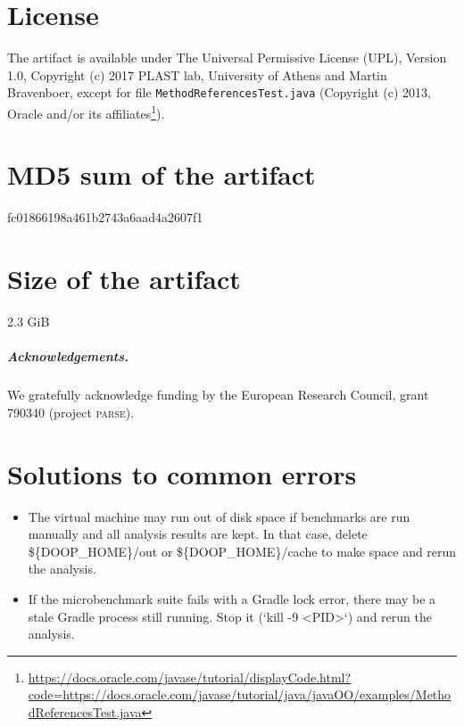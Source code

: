 \documentclass[a4paper,UKenglish]{darts-v2019}
\newcommand{\license}[1]{{\section{License}#1}}
\newcommand{\mdsum}[1]{{\section{MD5 sum of the artifact}#1}}
\newcommand{\artifactsize}[1]{{\section{Size of the artifact}#1}}
\newcommand{\fundacks}{We gratefully acknowledge funding by the European Research Council, grant 790340 (project \textsc{parse}).}
\begin{document}
\license{The artifact is available under The Universal Permissive
  License (UPL), Version 1.0, Copyright (c) 2017 PLAST lab, University
  of Athens and Martin Bravenboer, except for file
  \texttt{MethodReferencesTest.java} (Copyright (c) 2013, Oracle
  and/or its
  affiliates\footnote{\url{https://docs.oracle.com/javase/tutorial/displayCode.html?code=https://docs.oracle.com/javase/tutorial/java/javaOO/examples/MethodReferencesTest.java}}).}

\mdsum{fc01866198a461b2743a6aad4a2607f1}

\artifactsize{2.3 GiB}

\subparagraph*{Acknowledgements.}

\fundacks{}

\appendix
\section{Solutions to common errors}
\label{app:troubleshooting}

\begin{itemize}
\item The virtual machine may run out of disk space if benchmarks are
  run manually and all analysis results are kept. In that case, delete
  \$\{DOOP\_HOME\}/out or \$\{DOOP\_HOME\}/cache to make space and
  rerun the analysis.
\item If the microbenchmark suite fails with a Gradle lock error, there
  may be a stale Gradle process still running. Stop it (`kill -9 <PID>`)
  and rerun the analysis.
\end{itemize}





\end{document}
